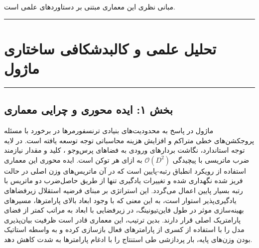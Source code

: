 \clearpage
{}
\vspace*{0.2cm}

مبانی نظری این معماری مبتنی بر دستاوردهای علمی \cite{hu2021lora} است.
\noindent\rule{\textwidth}{1.2pt}
\vspace*{0.1cm}
\section{تحلیل علمی و کالبدشکافی ساختاری ماژول }
\label{sec:mod_lora_attention}
\vspace*{-0.2cm}
\noindent\rule{\textwidth}{0.5pt}
\vspace*{0.3cm}

\subsection*{بخش ۱: ایده محوری و چرایی معماری }
ماژول  در پاسخ به محدودیت‌های بنیادی ترنسفورمرها در برخورد با مسئله پروجکشن‌های خطی متراکم و افزایش هزینه محاسباتی توجه توسعه یافته است. در لایه توجه استاندارد، نگاشت بردارهای ورودی به فضاهای پرس‌وجو ، کلید  و مقدار  نیازمند ضرب ماتریسی با پیچیدگی $\mathcal{O}(D^2)$ به ازای هر توکن است. ایده محوری این معماری استفاده از رویکرد انطباق رتبه-پایین  است که در آن ماتریس‌های وزن اصلی در حالت فریز شده نگهداری شده و تغییرات یادگیری تنها از طریق حاصل‌ضرب دو ماتریس با رتبه بسیار پایین اعمال می‌گردد. این استراتژی بر مبنای فرضیه استقلال زیرفضاهای یادگیری‌پذیر  استوار است، به این معنی که با وجود ابعاد بالای پارامترها، مسیرهای بهینه‌سازی موثر در طول فاین‌تیونینگ، در زیرفضایی با ابعاد به مراتب کمتر از فضای پارامتریک اصلی قرار دارند. بدین ترتیب، این معماری قادر است ظرفیت بیان‌پذیری  مدل را با استفاده از کسری از پارامترهای فعال بازسازی کرده و به واسطه استاتیک بودن وزن‌های پایه، بار پردازشی طی استنتاج  را با ادغام پارامترها به شدت کاهش دهد.

